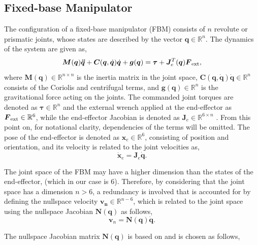 \documentclass[../main.tex]{subfiles}
\begin{document}
\subsection{Fixed-base Manipulator}
The configuration of a fixed-base manipulator (FBM) consists of $n$ revolute or prismatic joints, whose states are described by the vector $\bm{q} \in \mathbb{R}^n$. The dynamics of the system are given as,
\begin{equation}
    \label{eq:fixed_base_dynamics}
    \bm{M}(\bm{q})\bm{\ddot{q}} + \bm{C}(\bm{q}, \dot{\bm{q}})\dot{\bm{q}} + \bm{g}(\bm{q}) = \bm{\tau} + \bm{J}_e^T(\bm{q})\bm{{F}}_{\rm ext},
\end{equation} 
where $\bm{M}(\bm{q}) \in \mathbb{R}^{n \times n}$ is the inertia matrix in the joint space, $ \bm{C}(\bm{q}, \dot{\bm{q}})\dot{\bm{q}}  \in \mathbb{R}^{n}$ consists of the Coriolis and centrifugal terms, and $\bm{g}(\bm{q}) \in \mathbb{R}^n$ is the gravitational force acting on the joints. The commanded joint torques are denoted as $\bm{\tau} \in \mathbb{R}^n$ and the external wrench applied at the end-effector as $\bm{{F}}_{\rm ext} \in \mathbb{R}^6$, while the end-effector Jacobian is denoted as $\bm{J}_e \in \bm{\mathbb{R}}^{6 \times n}$ \cite{murray1994}. From this point on, for notational clarity, dependencies of the terms will be omitted.
The pose of the end-effector is denoted as $\bm{x}_e \in \mathbb{R}^6$, consisting of position and orientation, and its velocity is related to the joint velocities as,
\begin{equation}
    \label{eq:ee_velocity_FBM}
    \dot{\bm{x}}_e = \bm{J}_e\dot{\bm{q}}.
\end{equation}
\par The joint space of the FBM may have a higher dimension than the states of the end-effector, (which in our case is 6). Therefore, by considering that the joint space has a dimension $n>6$, a redundancy is involved that is accounted for by defining the nullspace velocity $\bm{v_n} \in \mathbb{R}^{n-6}$, which is related to the joint space using the nullspace Jacobian $\bm{N(q)}$ as follows,
\begin{equation}
    \label{eq:N_dynamics}
   {\bm{v}}_n = \bm{N(q)}\dot{\bm{q}}.
\end{equation} \par
The nullspace Jacobian matrix $\bm{N(q)}$ is based on  \cite{park1999} and is chosen as follows,
\end{document}
